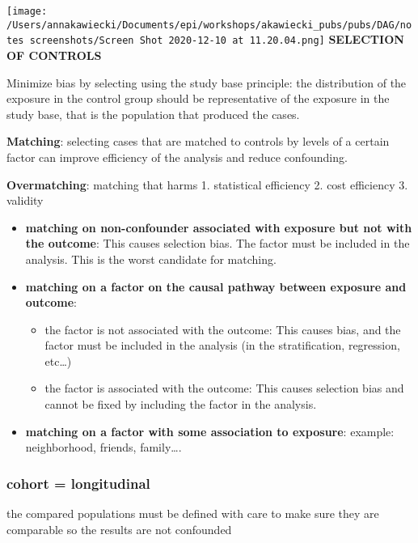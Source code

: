 \documentclass[
]{article}
\providecommand{\tightlist}{%
  \setlength{\itemsep}{0pt}\setlength{\parskip}{0pt}}
\begin{document}
\texttt{[image: /Users/annakawiecki/Documents/epi/workshops/akawiecki\_pubs/pubs/DAG/notes screenshots/Screen Shot 2020-12-10 at 11.20.04.png]}
\textbf{SELECTION OF CONTROLS}

Minimize bias by selecting using the study base principle: the
distribution of the exposure in the control group should be
representative of the exposure in the study base, that is the population
that produced the cases.

\textbf{Matching}: selecting cases that are matched to controls by
levels of a certain factor can improve efficiency of the analysis and
reduce confounding.

\textbf{Overmatching}: matching that harms 1. statistical efficiency 2.
cost efficiency 3. validity

\begin{itemize}
\item
  \textbf{matching on non-confounder associated with exposure but not
  with the outcome}: This causes selection bias. The factor must be
  included in the analysis. This is the worst candidate for matching.
\item
  \textbf{matching on a factor on the causal pathway between exposure
  and outcome}:

  \begin{itemize}
  \tightlist
  \item
    the factor is not associated with the outcome: This causes bias, and
    the factor must be included in the analysis (in the stratification,
    regression, etc\ldots)
  \item
    the factor is associated with the outcome: This causes selection
    bias and cannot be fixed by including the factor in the analysis.
  \end{itemize}
\item
  \textbf{matching on a factor with some association to exposure}:
  example: neighborhood, friends, family\ldots.
\end{itemize}

\hypertarget{cohort-longitudinal}{%
\subsubsection{cohort = longitudinal}\label{cohort-longitudinal}}

the compared populations must be defined with care to make sure they are
comparable so the results are not confounded
\end{document}
